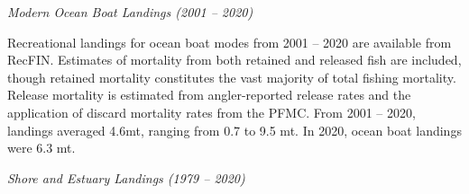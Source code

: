 \documentclass[11pt,
  english,
  a4paper,
]{article}
\begin{document}
\leavevmode\tagmcend\tagstructend\par


\emph{Modern Ocean Boat Landings (2001 -- 2020)}

\leavevmode\tagmcend\tagstructend\par


Recreational landings for ocean boat modes from 2001 -- 2020 are available from RecFIN. Estimates of mortality from both retained and released fish are included, though retained mortality constitutes the vast majority of total fishing mortality. Release mortality is estimated from angler-reported release rates and the application of discard mortality rates from the PFMC. From 2001 -- 2020, landings averaged 4.6mt, ranging from 0.7 to 9.5 mt. In 2020, ocean boat landings were 6.3 mt.

\leavevmode\tagmcend\tagstructend\par


\emph{Shore and Estuary Landings (1979 -- 2020)}

\leavevmode\tagmcend\tagstructend\par

\end{document}
